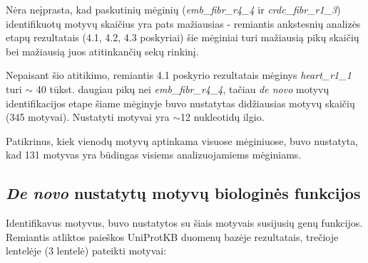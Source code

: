 \documentclass[12pt]{article}
\begin{document}
Nėra neįprasta, kad paskutinių mėginių (\small\emph{emb\_fibr\_r4\_4} ir
\small\emph{crdc\_fibr\_r1\_3}) identifikuotų motyvų skaičius yra pats
mažiausias - remiantis ankstesnių analizės etapų rezultatais (4.1, 4.2, 4.3
poskyriai) šie mėginiai turi mažiausią pikų skaičių bei mažiausią juos
atitinkančių sekų rinkinį.

Nepaisant šio atitikimo, remiantis 4.1 poskyrio rezultatais mėginys
\small\emph{heart\_r1\_1} turi \(\sim\) 40 tūkst. daugiau pikų nei
\small\emph{emb\_fibr\_r4\_4}, tačiau \emph{de novo} motyvų identifikacijos
etape šiame mėginyje buvo nustatytas didžiausias motyvų skaičių (345 motyvai).
Nustatyti motyvai yra \(\sim\)12 nukleotidų ilgio.

Patikrinus, kiek vienodų motyvų aptinkama visuose mėginiuose, buvo nustatyta,
kad 131 motyvas yra būdingas visiems analizuojamiems mėginiams.

\subsection{\emph{De novo} nustatytų motyvų biologinės funkcijos}
Identifikavus motyvus, buvo nustatytos su šiais motyvais susijusių genų
funkcijos. Remiantis atliktos paieškos UniProtKB\cite{UNIPROTKB} duomenų
bazėje rezultatais, trečioje lentelėje (3 lentelė) pateikti motyvai:
\end{document}
